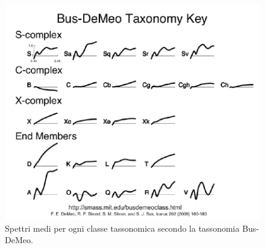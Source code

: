 \documentclass[a4paper,11pt,openright]{book}
\begin{document}
\begin{figure}[!ht]
    \centering
    \includegraphics[scale=0.44]{figure/spettro_bus.jpg}
    \caption[Spettri medi per ogni classe tassonomica secondo la tassonomia Bus-DeMeo.]{Spettri medi per ogni classe tassonomica secondo la tassonomia Bus-DeMeo. \citep{demeo_extension_2009}}
    \label{spettro_bus}
\end{figure}
\end{document}
